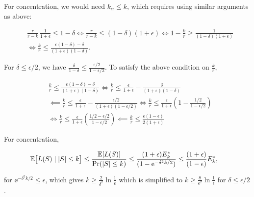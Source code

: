 \documentclass[12pt]{sty/colt2019/colt2018-arxiv}
\begin{document}
For concentration, we would need $k_\alpha \leq k$, which requires using similar arguments as above:

\begin{align*}
	& \frac r {r-k}\,\frac1{1+\epsilon} \leq 1 - \delta \iff \frac r {r-k} \leq (1-\delta) (1+\epsilon)   \iff 1 - \frac k{r} \geq \frac1{(1-\delta) (1+\epsilon)} \\
	& \iff \frac k{r} \leq \frac{\epsilon(1-\delta)- \delta}{(1+\epsilon)(1-\delta)}.
\end{align*}

For $\delta \leq \epsilon/2$, we have $\frac \delta{1-\delta} \leq \frac {\epsilon/2}{1- \epsilon/2}$. To satisfy the above condition on $\frac k{r}$,

\begin{align*}
	&	\frac k{r} \leq \frac{\epsilon(1-\delta)- \delta}{(1+\epsilon)(1-\delta)} \iff 	\frac  k{r} \leq \frac{\epsilon}{1+\epsilon} - \frac{\delta}{(1+\epsilon)(1-\delta)} \\
	&\impliedby 	\frac  k{r} \leq \frac{\epsilon}{1+\epsilon} - \frac{\epsilon/2}{(1+\epsilon)(1-\epsilon/2)} \iff 	\frac k{r} \leq \frac{\epsilon}{1+\epsilon} \left( 1- \frac{1/2}{1-\epsilon/2}\right)  \\
	&\iff \frac k{r} \leq \frac{\epsilon}{1+\epsilon} \left(  \frac{1/2 - \epsilon/2}{1-\epsilon/2}\right) \impliedby \frac kr \leq \frac {\epsilon (1-\epsilon)}{2(1+\epsilon)} 
\end{align*}	



For concentration, 

\begin{align*}
	& \mathbb E\big[L(S)\mid |S|\leq k\big] \leq \frac{\mathbb E[L(S)]}{\mathrm{Pr}(|S|\leq k)} \leq \frac {(1+\epsilon)E^*_k}{(1-\mathrm{e}^{-\delta^2k/2}) } \leq \frac{(1+\epsilon)}{(1- \epsilon) } E^*_k,  
\end{align*}

for $\ee^{-\delta^2k/2} \leq \epsilon $, which gives $k \geq \frac 2{\delta^2} \ln \frac1{\epsilon} $ which is simplified to  $k \geq \frac 8{\epsilon^2} \ln \frac1{\epsilon} $ for $\delta \leq \epsilon/2$.

\end{document}

